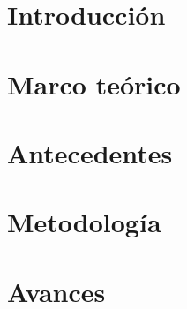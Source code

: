 \documentclass[12pt,letterpaper]{report}
\begin{document}


\tableofcontents
\newpage
{}

\chapter{Introducción}


%
%
%

\chapter{Marco teórico}


\chapter{Antecedentes}


%
%
%

\chapter{Metodología}


\chapter{Avances}


%

\renewcommand{\bibname}{Referencias}


\end{document}
